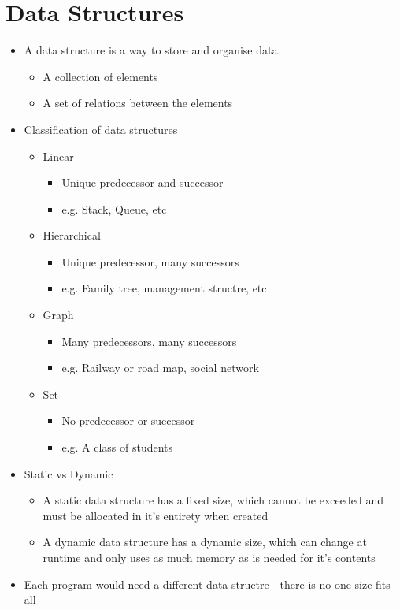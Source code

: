 
\section*{Data Structures}

\begin{itemize}
  \item A data structure is a way to store and organise data
  \begin{itemize}
    \item A collection of elements
    \item A set of relations between the elements
  \end{itemize}
  \item Classification of data structures
  \begin{itemize}
    \item Linear
    \begin{itemize}
      \item Unique predecessor and successor
      \item e.g. Stack, Queue, etc
    \end{itemize}
    \item Hierarchical
    \begin{itemize}
      \item Unique predecessor, many successors
      \item e.g. Family tree, management structre, etc
    \end{itemize}
    \item Graph
    \begin{itemize}
      \item Many predecessors, many successors
      \item e.g. Railway or road map, social network
    \end{itemize}
    \item Set
    \begin{itemize}
      \item No predecessor or successor
      \item e.g. A class of students
    \end{itemize}
  \end{itemize}
  \item Static vs Dynamic
  \begin{itemize}
    \item A static data structure has a fixed size, which cannot be exceeded and must be allocated in it's entirety when created
    \item A dynamic data structure has a dynamic size, which can change at runtime and only uses as much memory as is needed for it's contents
  \end{itemize}
  \item Each program would need a different data structre - there is no one-size-fits-all
\end{itemize}

